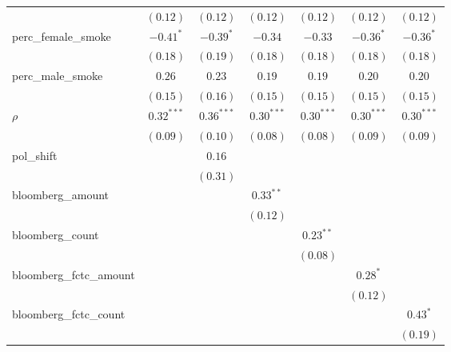 \begin{table}[!h]
\begin{center}
\begin{tabular}{l c c c c c c }
                        & $(0.12)$     & $(0.12)$     & $(0.12)$     & $(0.12)$     & $(0.12)$     & $(0.12)$     \\
perc\_female\_smoke     & $-0.41^{*}$  & $-0.39^{*}$  & $-0.34$      & $-0.33$      & $-0.36^{*}$  & $-0.36^{*}$  \\
                        & $(0.18)$     & $(0.19)$     & $(0.18)$     & $(0.18)$     & $(0.18)$     & $(0.18)$     \\
perc\_male\_smoke       & $0.26$       & $0.23$       & $0.19$       & $0.19$       & $0.20$       & $0.20$       \\
                        & $(0.15)$     & $(0.16)$     & $(0.15)$     & $(0.15)$     & $(0.15)$     & $(0.15)$     \\
$\rho$                  & $0.32^{***}$ & $0.36^{***}$ & $0.30^{***}$ & $0.30^{***}$ & $0.30^{***}$ & $0.30^{***}$ \\
                        & $(0.09)$     & $(0.10)$     & $(0.08)$     & $(0.08)$     & $(0.09)$     & $(0.09)$     \\
pol\_shift              &              & $0.16$       &              &              &              &              \\
                        &              & $(0.31)$     &              &              &              &              \\
bloomberg\_amount       &              &              & $0.33^{**}$  &              &              &              \\
                        &              &              & $(0.12)$     &              &              &              \\
bloomberg\_count        &              &              &              & $0.23^{**}$  &              &              \\
                        &              &              &              & $(0.08)$     &              &              \\
bloomberg\_fctc\_amount &              &              &              &              & $0.28^{*}$   &              \\
                        &              &              &              &              & $(0.12)$     &              \\
bloomberg\_fctc\_count  &              &              &              &              &              & $0.43^{*}$   \\
                        &              &              &              &              &              & $(0.19)$     \\

\end{tabular}
\end{center}
\end{table}
